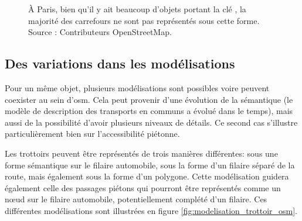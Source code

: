 \begin{figure}
    \centering
    \caption[Les carrefours OSM à Paris.]{À Paris, bien qu'il y ait beaucoup d'objets portant la clé , la majorité des carrefours ne sont pas représentés sous cette forme. Source : Contributeurs OpenStreetMap.}
    \label{fig:modelisation_carrefours_osm_paris}
\end{figure}

\subsection{Des variations dans les modélisations}

\label{sec:modelisation_variation_pieton_osm}


Pour un même objet, plusieurs modélisations sont possibles voire peuvent coexister au sein d'\gls{osm}. Cela peut provenir d'une évolution de la sémantique (le modèle de description des transports en communs a évolué dans le temps), mais aussi de la possibilité d'avoir plusieurs niveaux de détails. Ce second cas s'illustre particulièrement bien sur l'accessibilité piétonne.

\newpar{}

Les trottoirs peuvent être représentés de trois manières différentes: sous une forme sémantique sur le filaire automobile, sous la forme d'un filaire séparé de la route, mais également sous la forme d'un polygone. Cette modélisation guidera également celle des passages piétons qui pourront être représentés comme un nœud sur le filaire automobile, potentiellement complété d'un filaire. Ces différentes modélisations sont illustrées en figure \ref{fig:modelisation_trottoir_osm}.

